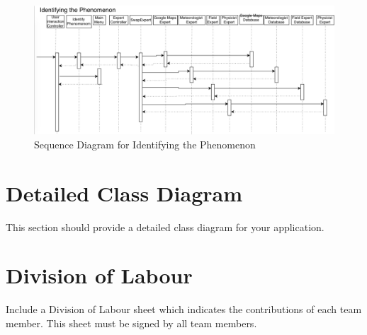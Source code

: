 \documentclass[]{article}
\begin{document}
\begin{figure}[!hb]
	\includegraphics[width=\linewidth]{sequenceDiagram4.png}
	\caption{Sequence Diagram for Identifying the Phenomenon}
\end{figure}


\section{Detailed Class Diagram}
\label{sec:detailed_class_diagram}
This section should provide a detailed class diagram for your application.

\appendix
\section{Division of Labour}
\label{sec:division_of_labour}
Include a Division of Labour sheet which indicates the contributions of each team member. This sheet must be signed by all team members.

\newpage
\end{document}
